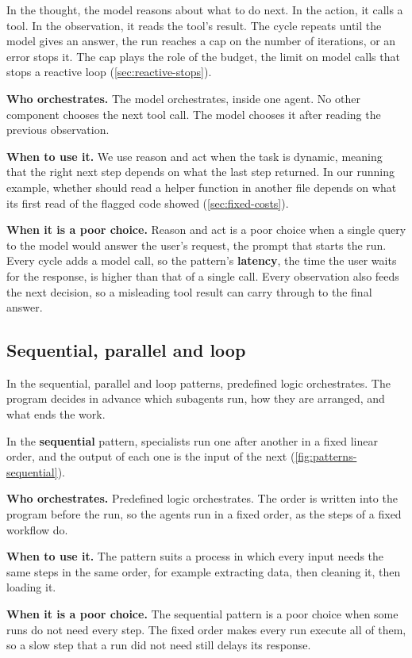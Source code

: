 In the thought, the model reasons about what to do next. In the action, it calls a tool. In the
observation, it reads the tool's result. The cycle repeats until the model gives an answer, the run
reaches a cap on the number of iterations, or an error stops it. The cap plays the role of the
budget, the limit on model calls that stops a reactive loop (\cref{sec:reactive-stops}).
\bi
\item \textbf{Who orchestrates.} The model orchestrates, inside one agent. No other component
chooses the next tool call. The model chooses it after reading the previous observation.
\item \textbf{When to use it.} We use reason and act when the task is dynamic, meaning that the
right next step depends on what the last step returned. In our running example, whether \msa{}
should read a helper function in another file depends on what its first read of the flagged code
showed (\cref{sec:fixed-costs}).
\item \textbf{When it is a poor choice.} Reason and act is a poor choice when a single query to the
model would answer the user's request, the prompt that starts the run. Every cycle adds a model
call, so the pattern's \textbf{latency}, the time the user waits for the response, is higher than
that of a single call. Every observation also feeds the next decision, so a misleading tool result
can carry through to the final answer.
\ei

\subsection{Sequential, parallel and loop}
\label{sec:patterns-predefined}

In the sequential, parallel and loop patterns, predefined logic orchestrates. The program decides in
advance which subagents run, how they are arranged, and what ends the work.

In the \textbf{sequential} pattern, specialists run one after another in a fixed linear order, and
the output of each one is the input of the next (\cref{fig:patterns-sequential}).
\bi
\item \textbf{Who orchestrates.} Predefined logic orchestrates. The order is written into the
program before the run, so the agents run in a fixed order, as the steps of a fixed workflow do.
\item \textbf{When to use it.} The pattern suits a process in which every input needs the same steps
in the same order, for example extracting data, then cleaning it, then loading it.
\item \textbf{When it is a poor choice.} The sequential pattern is a poor choice when some runs do
not need every step. The fixed order makes every run execute all of them, so a slow step that a run
did not need still delays its response.
\ei

